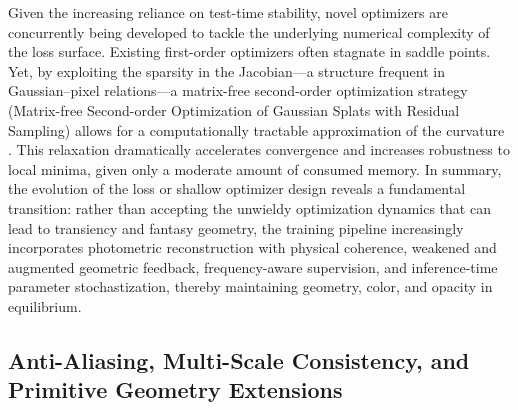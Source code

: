 \documentclass[11pt,a4paper]{article}
\begin{document}
Given the increasing reliance on test-time stability, novel optimizers are concurrently being developed to tackle the underlying numerical complexity of the loss surface. Existing first-order optimizers often stagnate in saddle points. Yet, by exploiting the sparsity in the Jacobian---a structure frequent in Gaussian--pixel relations---a matrix-free second-order optimization strategy (Matrix-free Second-order Optimization of Gaussian Splats with Residual Sampling) allows for a computationally tractable approximation of the curvature \cite{arxiv:2504.12905v3}. This relaxation dramatically accelerates convergence and increases robustness to local minima, given only a moderate amount of consumed memory. In summary, the evolution of the loss or shallow optimizer design reveals a fundamental transition: rather than accepting the unwieldy optimization dynamics that can lead to transiency and fantasy geometry, the training pipeline increasingly incorporates photometric reconstruction with physical coherence, weakened and augmented geometric feedback, frequency-aware supervision, and inference-time parameter stochastization, thereby maintaining geometry, color, and opacity in equilibrium.


\subsection{Anti-Aliasing, Multi-Scale Consistency, and Primitive Geometry Extensions}
\end{document}
